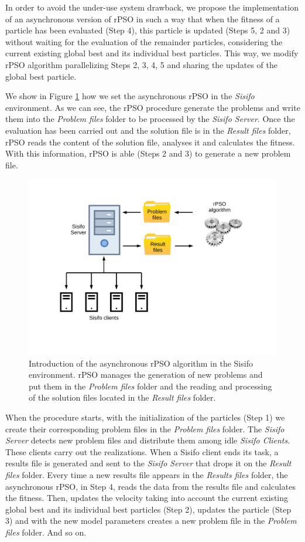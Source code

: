 In order to avoid the under-use system drawback, we propose the implementation of an asynchronous version of rPSO in such a way that when the fitness of a particle has been evaluated (Step 4), this particle is updated (Steps 5, 2 and 3) without waiting for the evaluation of the remainder particles, considering the current existing global best and its individual best particles. This way, we modify rPSO algorithm parallelizing Steps 2, 3, 4, 5 and sharing the updates of the global best particle.

We show in Figure \ref{rPSO.python} how we set the asynchronous rPSO in the \textit{Sisifo} environment. As we can see, the rPSO procedure generate the problems and write them into the \textit{Problem files} folder to be processed by the \textit{Sisifo Server}. Once the evaluation has been carried out and the solution file is in the \textit{Result  files} folder, rPSO reads the content of the solution file, analyses it and calculates the fitness. With this information, rPSO is able (Steps 2 and 3) to generate a new problem file. 

\begin{figure}[h!]
	\centering
	\includegraphics[width=0.6\linewidth]{IMGs/1.-Calibrado/Esquema_2.pdf}
	\caption{Introduction of the asynchronous rPSO algorithm in the Sisifo environment. rPSO manages the generation of new problems and put them in the \textit{Problem files} folder and the reading and processing of the solution files located in the \textit{Result  files} folder.}
	\label{rPSO.python}
\end{figure}

When the procedure starts, with the initialization of the particles (Step 1) we create their corresponding problem files in the \textit{Problem files} folder. The \textit{Sisifo Server} detects new problem files and distribute them among idle \textit{Sisifo Clients}. These clients carry out the realizations. When a Sisifo client ends its task, a results file is generated and sent to the \textit{Sisifo Server} that drops it on the \textit{Result files} folder. Every time a new results file appears in the \textit{Results files} folder, the asynchronous rPSO, in Step 4, reads the data from the results file and calculates the fitness. Then, updates the velocity taking into account the current existing global best and its individual best particles (Step 2), updates the particle (Step 3) and with the new model parameters creates a new problem file in the \textit{Problem files} folder. And so on. 


